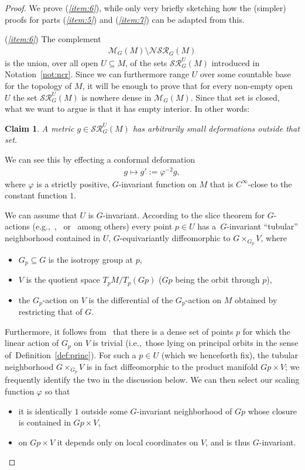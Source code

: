 \documentclass[10pt,a4paper]{amsart}
\numberwithin{equation}{section}
\newtheorem{Claim}[Theorem]{Claim}
 { \theoremstyle{definition}
\newtheorem{Definition}[Theorem]{Definition}
\newtheorem{Note}[Theorem]{Note}
\newtheorem{Example}[Theorem]{Example}
\newtheorem{Notation}[Theorem]{Notation}
\newtheorem{Remark}[Theorem]{Remark} }
\begin{document}
\begin{proof}
 We prove ({\it \ref{item:6}}), while only very briefly sketching how the (simpler) proofs for parts ({\it \ref{item:5}}) and ({\it \ref{item:7}}) can be adapted from this.

 ({\it \ref{item:6}}) The complement
 \begin{gather*}
 \mathcal{M}_G(M)\setminus \mathcal{NSR}_G(M)
 \end{gather*}
 is the union, over all open $U\subseteq M$, of the sets $\mathcal{SR}^U_G(M)$ introduced in Notation~\ref{not:ncr}. Since we can furthermore range $U$ over some countable base for the topology of $M$, it will be enough to prove that for every non-empty open $U$ the set $\mathcal{SR}^U_G(M)$ is nowhere dense in $\mathcal{M}_G(M)$. Since that set is closed, what we want to argue is that it has empty interior. In other words:

 \begin{Claim}
A metric $g\in \mathcal{SR}^U_G(M)$ has arbitrarily small deformations outside that set.
 \end{Claim}

 We can see this by effecting a conformal deformation
 \begin{gather*}
 g\mapsto g':=\varphi^{-2} g,
 \end{gather*}
 where $\varphi$ is a strictly positive, $G$-invariant function on $M$ that is $C^{\infty}$-close to the constant function $1$.

 We can assume that $U$ is $G$-invariant. According to the slice theorem for $G$-actions (e.g.,~\cite[Th\'eor\`eme, p.~139]{ksz},~\cite[Theorem~1]{my} or~\cite[Theorem~I.2.1]{aud} among others) every point $p\in U$ has a~$G$-invariant ``tubular'' neighborhood contained in $U$, $G$-equivariantly diffeomorphic to $G\times_{G_p}V$, where
 \begin{itemize}\itemsep=0pt
 \item $G_p\subseteq G$ is the isotropy group at $p$,
 \item $V$ is the quotient space $T_pM/T_p (Gp)$ ($Gp$ being the orbit through $p$),
 \item the $G_p$-action on $V$ is the differential of the $G_p$-action on $M$ obtained by restricting that of $G$.
 \end{itemize}
 Furthermore, it follows from~\cite[Proposition~I.2.5]{aud} that there is a dense set of points $p$ for which the linear action of $G_p$ on $V$ is trivial (i.e.,~those lying on principal orbits in the sense of~Definition~\ref{def:princ}). For such a $p\in U$ (which we henceforth fix), the tubular neighborhood $G\times_{G_p}V$ is in fact diffeomorphic to the product manifold $Gp\times V$; we frequently identify the two in the discussion below. We can then select our scaling function $\varphi$ so that
 \begin{itemize}\itemsep=0pt
 \item it is identically $1$ outside some $G$-invariant neighborhood of $Gp$ whose closure is contained in $Gp\times V$,
 \item on $Gp\times V$ it depends only on local coordinates on $V$, and is thus $G$-invariant.
 \end{itemize}


\end{proof}
\end{document}
